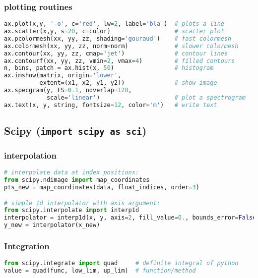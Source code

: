 \documentclass[]{article}
\begin{document}
\subsubsection{plotting routines}\label{plotting-routines}

\begin{lstlisting}[language=Python]
ax.plot(x,y, '-o', c='red', lw=2, label='bla')  # plots a line
ax.scatter(x,y, s=20, c=color)                  # scatter plot
ax.pcolormesh(xx, yy, zz, shading='gouraud')    # fast colormesh
ax.colormesh(xx, yy, zz, norm=norm)             # slower colormesh
ax.contour(xx, yy, zz, cmap='jet')              # contour lines
ax.contourf(xx, yy, zz, vmin=2, vmax=4)         # filled contours
n, bins, patch = ax.hist(x, 50)                 # histogram
ax.imshow(matrix, origin='lower',
          extent=(x1, x2, y1, y2))              # show image
ax.specgram(y, FS=0.1, noverlap=128,
            scale='linear')                     # plot a spectrogram
ax.text(x, y, string, fontsize=12, color='m')   # write text
\end{lstlisting}

\subsection{\texorpdfstring{Scipy
(\texttt{import\ scipy\ as\ sci})}{Scipy (import scipy as sci)}}\label{scipy-import-scipy-as-sci}

\subsubsection{interpolation}\label{interpolation}

\begin{lstlisting}[language=Python]
# interpolate data at index positions:
from scipy.ndimage import map_coordinates
pts_new = map_coordinates(data, float_indices, order=3)

# simple 1d interpolator with axis argument:
from scipy.interpolate import interp1d
interpolator = interp1d(x, y, axis=2, fill_value=0., bounds_error=False)
y_new = interpolator(x_new)
\end{lstlisting}

\subsubsection{Integration}\label{integration}

\begin{lstlisting}[language=Python]
from scipy.integrate import quad     # definite integral of python
value = quad(func, low_lim, up_lim)  # function/method
\end{lstlisting}
\end{document}
